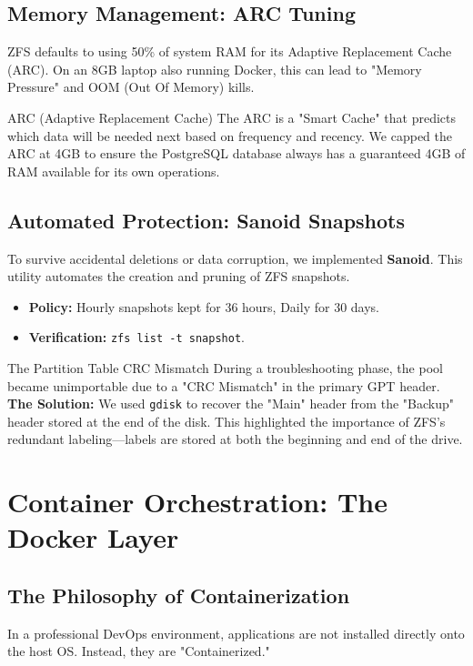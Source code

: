 \documentclass[12pt,a4paper,oneside]{book}
\begin{document}
\section{Memory Management: ARC Tuning}
ZFS defaults to using 50\% of system RAM for its Adaptive Replacement Cache (ARC). On an 8GB laptop also running Docker, this can lead to "Memory Pressure" and OOM (Out Of Memory) kills.

\begin{conceptbox}{ARC (Adaptive Replacement Cache)}
The ARC is a "Smart Cache" that predicts which data will be needed next based on frequency and recency. We capped the ARC at 4GB to ensure the PostgreSQL database always has a guaranteed 4GB of RAM available for its own operations.
\end{conceptbox}

\section{Automated Protection: Sanoid Snapshots}
To survive accidental deletions or data corruption, we implemented \textbf{Sanoid}. This utility automates the creation and pruning of ZFS snapshots.

\begin{itemize}
    \item \textbf{Policy:} Hourly snapshots kept for 36 hours, Daily for 30 days.
    \item \textbf{Verification:} \texttt{zfs list -t snapshot}.
\end{itemize}

\begin{techwarning}{The Partition Table CRC Mismatch}
During a troubleshooting phase, the pool became unimportable due to a "CRC Mismatch" in the primary GPT header. 
\textbf{The Solution:} We used \texttt{gdisk} to recover the "Main" header from the "Backup" header stored at the end of the disk. This highlighted the importance of ZFS's redundant labeling—labels are stored at both the beginning and end of the drive.
\end{techwarning}

\chapter{Container Orchestration: The Docker Layer}

\section{The Philosophy of Containerization}
In a professional DevOps environment, applications are not installed directly onto the host OS. Instead, they are "Containerized." 
\end{document}
